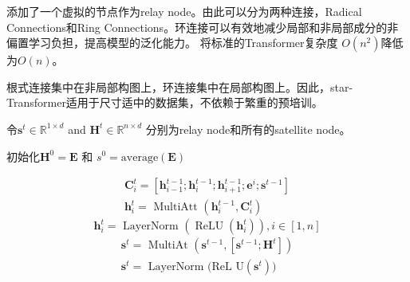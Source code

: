 \documentclass[a4paper,UTF8]{article}
\numberwithin{equation}{section}
\begin{document}
添加了一个虚拟的节点作为relay node。由此可以分为两种连接，Radical Connections和Ring Connections。环连接可以有效地减少局部和非局部成分的非偏置学习负担，提高模型的泛化能力。
将标准的Transformer复杂度 $O(n^2)$降低为$O(n)$。

根式连接集中在非局部构图上，环连接集中在局部构图上。因此，star-Transformer适用于尺寸适中的数据集，不依赖于繁重的预培训。

令$\mathbf{s}^{t} \in \mathbb{R}^{1 \times d}$ and $\mathbf{H}^{t} \in \mathbb{R}^{n \times d}$ 分别为relay node和所有的satellite node。

初始化$\mathbf{H}^{0}=\mathbf{E}$ 和 $s^0 = \text{average}(\mathbf{E})$

$$
\begin{array}{l}{\mathbf{C}_{i}^{t}=\left[\mathbf{h}_{i-1}^{t-1} ; \mathbf{h}_{i}^{t-1} ; \mathbf{h}_{i+1}^{t-1} ; \mathbf{e}^{i} ; \mathbf{s}^{t-1}\right]} \\ {\mathbf{h}_{i}^{t}=\text { MultiAtt }\left(\mathbf{h}_{i}^{t-1}, \mathbf{C}_{i}^{t}\right)}\end{array}
$$
$$
\mathbf{h}_{i}^{t}=\text { LayerNorm }\left(\operatorname{ReLU}\left(\mathbf{h}_{i}^{t}\right)\right), i \in[1, n]
$$
$$
\begin{array}{l}{\mathbf{s}^{t}=\text { MultiAt }\left(\mathbf{s}^{t-1},\left[\mathbf{s}^{t-1} ; \mathbf{H}^{t}\right]\right)} \\ {\mathbf{s}^{t}=\text { LayerNorm (ReL } \mathrm{U}\left(\mathbf{s}^{t}\right) )}\end{array}
$$

\newpage
\end{document}
